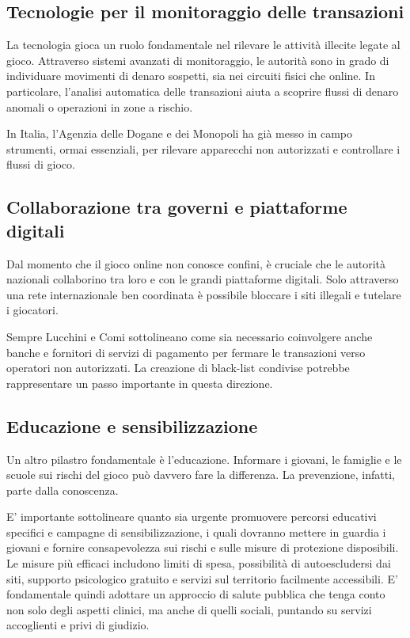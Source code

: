 \documentclass[a4paper,12pt]{article}
\begin{document}
\subsection{Tecnologie per il monitoraggio delle transazioni}

La tecnologia gioca un ruolo fondamentale nel rilevare le attività illecite legate al gioco. Attraverso sistemi avanzati di monitoraggio, le autorità sono in grado di individuare movimenti di denaro sospetti, sia nei circuiti fisici che online. In particolare, l'analisi automatica delle transazioni aiuta a scoprire flussi di denaro anomali o operazioni in zone a rischio.

In Italia, l’Agenzia delle Dogane e dei Monopoli ha già messo in campo strumenti, ormai essenziali, per rilevare apparecchi non autorizzati e controllare i flussi di gioco.
\cite{lucchini2022socialcosts}

\subsection{Collaborazione tra governi e piattaforme digitali}

Dal momento che il gioco online non conosce confini, è cruciale che le autorità nazionali collaborino tra loro e con le grandi piattaforme digitali. Solo attraverso una rete internazionale ben coordinata è possibile bloccare i siti illegali e tutelare i giocatori.

Sempre Lucchini e Comi sottolineano come sia necessario coinvolgere anche banche e fornitori di servizi di pagamento per fermare le transazioni verso operatori non autorizzati. La creazione di black-list condivise potrebbe rappresentare un passo importante in questa direzione.
\cite{lucchini2022socialcosts}

\subsection{Educazione e sensibilizzazione}

Un altro pilastro fondamentale è l’educazione. Informare i giovani, le famiglie e le scuole sui rischi del gioco può davvero fare la differenza. La prevenzione, infatti, parte dalla conoscenza.

E' importante sottolineare quanto sia urgente promuovere percorsi educativi specifici e campagne di sensibilizzazione, i quali dovranno mettere in guardia i giovani e fornire consapevolezza sui rischi e sulle misure di protezione disposibili. Le misure più efficaci includono limiti di spesa, possibilità di autoescludersi dai siti, supporto psicologico gratuito e servizi sul territorio facilmente accessibili. E' fondamentale quindi adottare un approccio di salute pubblica che tenga conto non solo degli aspetti clinici, ma anche di quelli sociali, puntando su servizi accoglienti e privi di giudizio.
 \cite{lucchini2022socialcosts}
\end{document}

